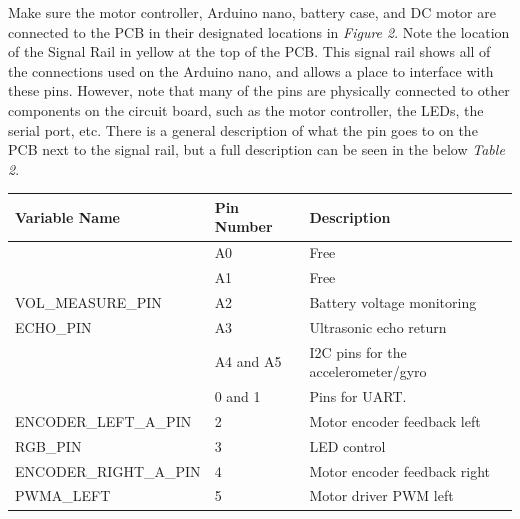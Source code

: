 \documentclass[12pt]{article}
\begin{document}
Make sure the motor controller, Arduino nano, battery case, and DC motor are connected to the PCB in their designated locations in \textit{Figure 2}. Note the location of the Signal Rail in yellow at the top of the PCB. This signal rail shows all of the connections used on the Arduino nano, and allows a place to interface with these pins. However, note that many of the pins are physically connected to other components on the circuit board, such as the motor controller, the LEDs, the serial port, etc. There is a general description of what the pin goes to on the PCB next to the signal rail, but a full description can be seen in the below \textit{Table 2}.
\begin{table}[H]
\centering
\begin{tabular}{|l|l|l|}
\hline 
Variable Name          & Pin Number & Description                                                                    \\ \hline\hline
                       & A0         & Free                                                                        \\ \hline
                       & A1         & Free                                                                        \\ \hline
VOL\_MEASURE\_PIN      & A2         & Battery voltage monitoring                                                     \\ \hline
ECHO\_PIN              & A3         & Ultrasonic echo return                                                         \\ \hline
                       & A4 and A5  & I2C pins for the accelerometer/gyro                                            \\\hline
                       & 0 and 1    & Pins for UART.                                                              \\ \hline
ENCODER\_LEFT\_A\_PIN  & 2          & Motor encoder feedback left                                                    \\ \hline
RGB\_PIN               & 3          & LED control                                                                    \\ \hline
ENCODER\_RIGHT\_A\_PIN & 4          & Motor encoder feedback right                                                   \\ \hline
PWMA\_LEFT             & 5          & Motor driver PWM left                                                          \\ \hline

\end{tabular}
\end{table}
\end{document}
